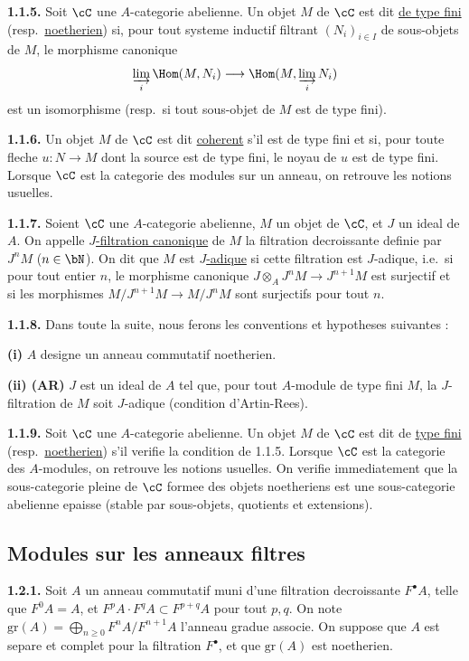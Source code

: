 \medskip
\noindent\textbf{1.1.5.} Soit $\cC$ une $A$-categorie abelienne. Un objet $M$ de $\cC$ est dit \underline{de type fini} (resp.\ \underline{noetherien}) si, pour tout systeme inductif filtrant $(N_i)_{i \in I}$ de sous-objets de $M$, le morphisme canonique
\[
\varinjlim_i \Hom(M,N_i) \longrightarrow \Hom(M, \varinjlim_i N_i)
\]
est un isomorphisme (resp.\ si tout sous-objet de $M$ est de type fini).

\medskip
\noindent\textbf{1.1.6.} Un objet $M$ de $\cC$ est dit \underline{coherent} s'il est de type fini et si, pour toute fleche $u : N \longrightarrow M$ dont la source est de type fini, le noyau de $u$ est de type fini. Lorsque $\cC$ est la categorie des modules sur un anneau, on retrouve les notions usuelles.

\medskip
\noindent\textbf{1.1.7.} Soient $\cC$ une $A$-categorie abelienne, $M$ un objet de $\cC$, et $J$ un ideal de $A$. On appelle \underline{$J$-filtration canonique} de $M$ la filtration decroissante definie par $J^n M$ ($n \in \bN$). On dit que $M$ est \underline{$J$-adique} si cette filtration est $J$-adique, i.e.\ si pour tout entier $n$, le morphisme canonique $J \otimes_A J^n M \longrightarrow J^{n+1} M$ est surjectif et si les morphismes $M/J^{n+1} M \longrightarrow M/J^n M$ sont surjectifs pour tout $n$.

\medskip
\noindent\textbf{1.1.8.} Dans toute la suite, nous ferons les conventions et hypotheses suivantes :

\textbf{(i)} $A$ designe un anneau commutatif noetherien.

\textbf{(ii) (AR)} $J$ est un ideal de $A$ tel que, pour tout $A$-module de type fini $M$, la $J$-filtration de $M$ soit $J$-adique (condition d'Artin-Rees).

\medskip
\noindent\textbf{1.1.9.} Soit $\cC$ une $A$-categorie abelienne. Un objet $M$ de $\cC$ est dit de \underline{type fini} (resp.\ \underline{noetherien}) s'il verifie la condition de 1.1.5. Lorsque $\cC$ est la categorie des $A$-modules, on retrouve les notions usuelles. On verifie immediatement que la sous-categorie pleine de $\cC$ formee des objets noetheriens est une sous-categorie abelienne epaisse (stable par sous-objets, quotients et extensions).

\subsection{Modules sur les anneaux filtres}

\medskip
\noindent\textbf{1.2.1.} Soit $A$ un anneau commutatif muni d'une filtration decroissante $F^\bullet A$, telle que $F^0 A = A$, et $F^p A \cdot F^q A \subset F^{p+q} A$ pour tout $p,q$. On note $\mathrm{gr}(A) = \bigoplus_{n \geq 0} F^n A/F^{n+1} A$ l'anneau gradue associe. On suppose que $A$ est separe et complet pour la filtration $F^\bullet$, et que $\mathrm{gr}(A)$ est noetherien.

